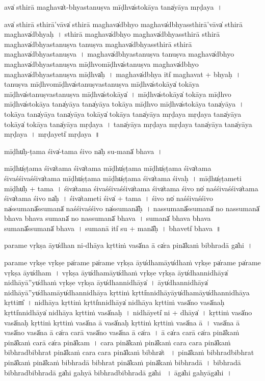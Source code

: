 \documentclass[parskip, DIV=14]{scrartcl}
\begin{document}
{ava̍ sthi॒rā ma॒ghava̍t-bhyastanuṣva॒ mīḍhva̍sto॒kāya॒ tana̍yāya mṛḍaya~।

ava̍ sthi॒rā sthi॒rā'vāva̍ sthi॒rā ma॒ghava̍dbhyo ma॒ghava̍dbhyassthi॒rā'vāva̍ sthi॒rā ma॒ghava̍dbhyaḥ~।
sthi॒rā ma॒ghava̍dbhyo ma॒ghava̍dbhyassthi॒rā sthi॒rā ma॒ghava̍dbhyastanuṣva tanuṣva ma॒ghava̍dbhyassthi॒rā sthi॒rā ma॒ghava̍dbhyastanuṣva~।
ma॒ghava̍dbhyastanuṣva tanuṣva ma॒ghava̍dbhyo ma॒ghava̍dbhyastanuṣva mīḍhvo॒mīḍhva̍stanuṣva ma॒ghava̍dbhyo ma॒ghava̍dbhyastanuṣva॒ mīḍhva̍ḥ~। %
ma॒ghava̍dbhya॒ iti̍ ma॒ghavat + bhya॒ḥ॒~।
ta॒nu॒ṣva॒ mīḍhvo॒mīḍhva̍stanuṣvastanuṣva॒ mīḍhva̍sto॒kāya̍ to॒kāya॒ mīḍhva̍stanuṣvastanuṣva॒ mīḍhva̍sto॒kāya̍~।
mīḍhva̍sto॒kāya̍ to॒kāya॒ mīḍhvo॒ mīḍhva̍sto॒kāya॒ tana̍yāya॒ tana̍yāya to॒kāya॒ mīḍhvo॒ mīḍhva̍sto॒kāya॒ tana̍yāya~।
to॒kāya॒ tana̍yāya॒ tana̍yāya to॒kāya̍ to॒kāya॒ tana̍yāya mṛḍaya mṛḍaya॒ tana̍yāya to॒kāya̍ to॒kāya॒ tana̍yāya mṛḍaya~।
tana̍yāya mṛḍaya mṛḍaya॒ tana̍yāya॒ tana̍yāya mṛḍaya~।
mṛ॒ḍa॒yeti̍ mṛḍaya~॥ 

mīḍhu̍ḥ-ṭama॒ śiva̍-tama śi॒vo na̍ḥ su॒-manā̍ bhava~।

mīḍhu̍ṣṭama॒ śiva̍tama॒ śiva̍tama॒ mīḍhu̍ṣṭama॒ mīḍhu̍ṣṭama॒ śiva̍tama śi॒vaśśi॒vaśśiva̍tama॒ mīḍhu̍ṣṭama॒ mīḍhu̍ṣṭama॒ śiva̍tama śi॒vaḥ~।
mīḍhu̍ṣṭa॒meti॒ mīḍhu̍ḥ + ta॒ma॒~।
śiva̍tama śi॒vaśśi॒vaśśiva̍tama॒ śiva̍tama śi॒vo no̍ naśśi॒vaśśiva̍tama॒ śiva̍tama śi॒vo na̍ḥ~।
śiva̍ta॒meti॒ śiva̍ + ta॒ma॒~।
śi॒vo no̍ naśśi॒vaśśi॒vo na̍ssu॒manā̎ssu॒manā̍ naśśi॒vaśśi॒vo na̍ssu॒manā̎ḥ~।
na॒ssu॒manā̎ssu॒manā̍ no nassu॒manā̍ bhava bhava su॒manā̍ no nassu॒manā̍ bhava~।
su॒manā̍ bhava bhava su॒manā̎ssu॒manā̍ bhava~।
su॒manā॒ iti̍ su + manā̎ḥ~।
bha॒veti̍ bhava~॥ 

pa॒ra॒me vṛ॒kṣa āyu̍dhan ni-dhāya॒ kṛttiṁ vasā̍na॒ ā ca̍ra॒ pinā̍ka॒ṁ bibhra॒dā ga̍hi~।

pa॒ra॒me vṛ॒kṣe vṛ॒kṣe pa̍ra॒me pa̍ra॒me vṛ॒kṣa āyu̍dha॒māyu̍dhaṁ vṛ॒kṣe pa̍ra॒me pa̍ra॒me vṛ॒kṣa āyu̍dham~।
vṛ॒kṣa āyu̍dha॒māyu̍dhaṁ vṛ॒kṣe vṛ॒kṣa āyu̍dhanni॒dhāya̍ ni॒dhāyā''yu̍dhaṁ vṛ॒kṣe vṛ॒kṣa āyu̍dhanni॒dhāya̍~।
āyu̍dhanni॒dhāya̍ ni॒dhāyā''yu̍dha॒māyu̍dhanni॒dhāya॒ kṛtti॒ṁ kṛtti̍nni॒dhāyāyu̍dha॒māyu̍dhanni॒dhāya॒ kṛttim̎~।
ni॒dhāya॒ kṛtti॒ṁ kṛtti̍nni॒dhāya̍ ni॒dhāya॒ kṛtti॒ṁ vasā̍no॒ vasā̍na॒ḥ kṛtti̍nni॒dhāya̍ ni॒dhāya॒ kṛtti॒ṁ vasā̍naḥ~।
ni॒dhāyeti̍ ni + dhāya̍~।
kṛtti॒ṁ vasā̍no॒ vasā̍na॒ḥ  kṛtti॒ṁ kṛtti॒ṁ vasā̍na॒ ā vasā̍na॒ḥ  kṛtti॒ṁ kṛtti॒ṁ vasā̍na॒ ā~।
vasā̍na॒ ā vasā̍no॒ vasā̍na॒ ā ca̍ra ca॒rā vasā̍no॒ vasā̍na॒ ā ca̍ra~।
ā ca̍ra ca॒rā ca̍ra॒ pinā̍ka॒ṁ pinā̍kaṁ ca॒rā ca̍ra॒ pinā̍kam~।
ca॒ra॒ pinā̍ka॒ṁ pinā̍kaṁ cara cara॒ pinā̍ka॒ṁ bibhra॒dbibhra॒t pinā̍kaṁ cara cara॒ pinā̍ka॒ṁ bibhra̍t ~।
pinā̍ka॒ṁ bibhra॒dbibhra॒t pinā̍ka॒ṁ pinā̍ka॒ṁ bibhra॒dā bibhra॒t pinā̍ka॒ṁ pinā̍ka॒ṁ bibhra॒dā~।
bibhra॒dā bibhra॒dbibhra॒dā ga̍hi ga॒hyā bibhra॒dbibhra॒dā ga̍hi ~।
āga̍hi ga॒hyāga̍hi~।

}
\end{document}
